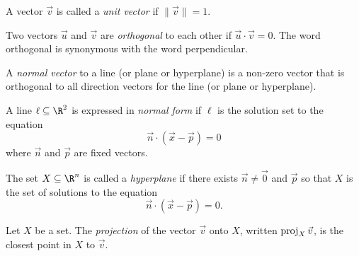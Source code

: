 \begin{SaveDefinition}[key=UnitVector, title={Unit Vector}]
	A vector $\vec v$ is called a
	\emph{unit vector} if $\|\vec v\|=1$.
\end{SaveDefinition}

\begin{SaveDefinition}[key=Orthogonal, title={Orthogonal}]
	Two vectors $\vec u$ and $\vec v$ are
	\emph{orthogonal} to each other if $\vec u\cdot \vec v=0$. The word orthogonal
	is synonymous with the word perpendicular.
\end{SaveDefinition}

\begin{SaveDefinition}[key=NormalVector, title={Normal Vector}]
	A
	\emph{normal vector} to a line (or plane or hyperplane) is a non-zero
	vector that is orthogonal to all direction vectors for the line (or plane
	or hyperplane).
\end{SaveDefinition}

\begin{SaveDefinition}[key=NormalFormofaLine, title={Normal Form of a Line}]
	A line $\ell\subseteq \R^2$ is expressed in \emph{normal form} if $\ell$
	is the solution set to the equation
	\[
		\vec n\cdot (\vec x-\vec p)=0
	\]
	where $\vec n$ and $\vec p$ are fixed vectors.
\end{SaveDefinition}

\begin{SaveDefinition}[key=Hyperplane, title={Hyperplane}]
	The set $X\subseteq \R^n$ is called a \emph{hyperplane} if there
	exists $\vec n\neq \vec 0$ and $\vec p$ so that $X$ is the set of solutions
	to the equation
	\[
		\vec n\cdot (\vec x-\vec p)=0.
	\]
\end{SaveDefinition}


\begin{SaveDefinition}[key=Projection, title={Projection}]
	Let $X$ be a set. The
	\emph{projection} of the vector $\vec v$ onto $X$, written $\operatorname{proj}_{X}\vec
	v$, is the closest point in $X$ to $\vec v$.
\end{SaveDefinition}

